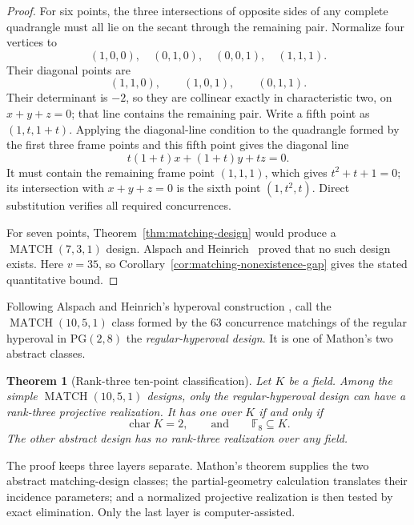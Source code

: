 \documentclass[11pt]{article}
\newtheorem{theorem}{Theorem}[section]
\theoremstyle{definition}
\theoremstyle{remark}
\newcommand{\PG}{\mathrm{PG}}
\newcommand{\F}{\mathbb{F}}
\begin{document}
\begin{proof}
For six points, the three intersections of opposite sides of any complete
quadrangle must all lie on the secant through the remaining pair.  Normalize
four vertices to
\[
 (1,0,0),\quad(0,1,0),\quad(0,0,1),\quad(1,1,1).
\]
Their diagonal points are
\[
 (1,1,0),\qquad(1,0,1),\qquad(0,1,1).
\]
Their determinant is \(-2\), so they are collinear exactly in
characteristic two, on \(x+y+z=0\); that line contains the remaining pair.
Write a fifth point as $(1,t,1+t)$.  Applying the diagonal-line condition
to the quadrangle formed by the first three frame points and this fifth
point gives the diagonal line
\[
 t(1+t)x+(1+t)y+tz=0.
\]
It must contain the remaining frame point \((1,1,1)\), which gives
$t^2+t+1=0$; its intersection with \(x+y+z=0\) is the sixth point
$(1,t^2,t)$.  Direct substitution verifies all required concurrences.

For seven points, Theorem~\ref{thm:matching-design} would produce a
$\operatorname{MATCH}(7,3,1)$ design.  Alspach and
Heinrich~\cite[Theorem~3.1]{AlspachHeinrich1990} proved that no such design
exists.  Here $v=35$, so
Corollary~\ref{cor:matching-nonexistence-gap} gives the stated quantitative
bound.
\end{proof}

Following Alspach and Heinrich's hyperoval construction
\cite[Theorem~1.2]{AlspachHeinrich1990}, call the
\(\operatorname{MATCH}(10,5,1)\) class formed by the \(63\) concurrence
matchings of the regular hyperoval in \(\PG(2,8)\) the
\emph{regular-hyperoval design}.  It is one of Mathon's two abstract
classes.

\begin{theorem}[Rank-three ten-point classification]
\label{thm:match-ten-realization}
Let $K$ be a field.  Among the simple
$\operatorname{MATCH}(10,5,1)$ designs, only the regular-hyperoval design
can have a rank-three projective realization.  It has one over $K$ if and
only if
\[
 \operatorname{char}K=2,
 \qquad\text{and}\qquad
 \F_8\subseteq K.
\]
The other abstract design has no rank-three realization over any field.
\end{theorem}

The proof keeps three layers separate.  Mathon's theorem supplies the two
abstract matching-design classes; the partial-geometry calculation translates
their incidence parameters; and a normalized projective realization is then
tested by exact elimination.  Only the last layer is computer-assisted.
\end{document}
